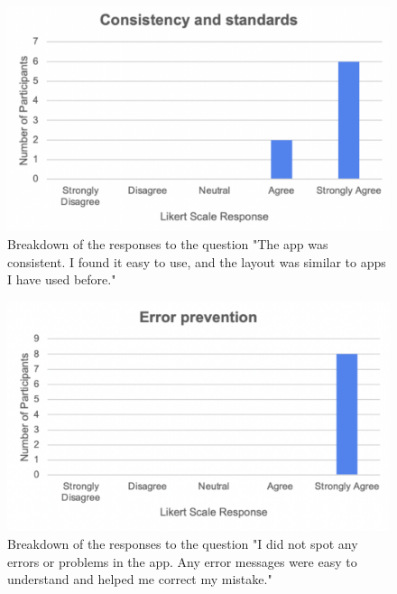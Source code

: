 \documentclass{l4proj}
\begin{document}
\begin{appendices}
\begin{figure}[H]
    \begin{centering}
    \includegraphics[scale=0.5]{images/heuristic4.pdf}
    \caption{Breakdown of the responses to the question "The app was consistent. I found it easy to use, and the layout was similar to apps I have used before."}
    \label{fig: heuristic4}
    \end{centering}
\end{figure}

\begin{figure}[H]
    \begin{centering}
    \includegraphics[scale=0.5]{images/heuristic5.pdf}
    \caption{Breakdown of the responses to the question "I did not spot any errors or problems in the app. Any error messages were easy to understand and helped me correct my mistake."}
    \label{fig: heuristic5}
    \end{centering}
\end{figure}


\end{appendices}
\end{document}
